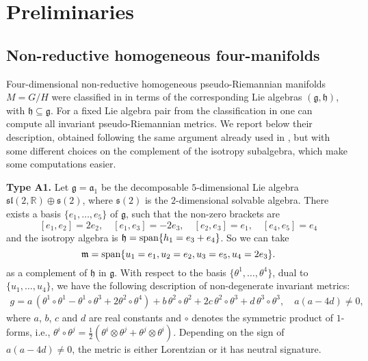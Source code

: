 \documentclass{amsart}
\theoremstyle{plain}
\theoremstyle{remark}
\def\R{\mathbb{R}}
\newcommand\A{{\mathfrak{a}}}
\newcommand\g{{\mathfrak{g}}}
\newcommand\h{{\mathfrak{h}}}
\newcommand\m{{\mathfrak{m}}}
\begin{document}

\section{Preliminaries} \label{sec:preliminaries}

\subsection{Non-reductive homogeneous four-manifolds}
\setcounter{equation}{0}

Four-dimensional non-reductive homogeneous pseudo-Riemannian manifolds $M=G/H$ were classified in \cite{FR} in terms of the corresponding Lie algebras $(\g,\h)$, with $\h \subseteq \g$. For a fixed Lie algebra pair from the classification in \cite{FR} one can compute all invariant pseudo-Riemannian metrics. We report below their description, obtained following the same argument already used in \cite{CF}, but with some different choices on the complement of the isotropy subalgebra, which make some computations easier. 

\medskip\noindent
{\bf Type A1.} Let $\g=\A _1$ be the decomposable $5$-dimensional Lie algebra $\mathfrak{sl}(2,\R) \oplus \mathfrak{s} (2)$, where $\mathfrak{s} (2)$ is the $2$-dimensional solvable algebra. There exists a basis $\{e_1,\ldots,e_5\}$ of $\g$, such that the non-zero brackets are
\[
[e_1,e_2]=2e_2, \quad [e_1,e_3]=-2e_3, \quad [e_2,e_3]=e_1, \quad [e_4,e_5]=e_4
\]
and the isotropy algebra is $\h={\rm span}\{h_1=e_3+e_4\}$. So we can take
\begin{equation}\label{eq:mA1}
\m= {\rm span}\{u_1=e_1,u_2=e_2,u_3=e_5,u_4=2 e_3\}.
\end{equation}
as a complement of $\h$ in $\g$. With respect to the basis $\{\theta^1,\ldots,\theta^4\}$, dual to $\{u_1,\ldots,u_4\}$, we have the following description of non-degenerate invariant metrics:
\begin{equation}\label{gA1}
\begin{array}{l} g=   a \,\left(\theta^1 \circ \theta^1 - \theta^1 \circ \theta^3+2 \theta^2 \circ \theta^4\right) +b\, \theta^2 \circ \theta^2 + 2c \, \theta^2 \circ \theta^3+d \, \theta^3 \circ \theta^3,  \quad a ( a -4d)\neq 0,
\end{array}
\end{equation}
where $a$, $b$, $c$ and $d$ are real constants and $\circ$ denotes the symmetric product of $1$-forms, i.e., $\theta^i \circ \theta^j = \frac{1}{2}(\theta^i\otimes\theta^j + \theta^j\otimes\theta^i)$. Depending on the sign of
 $a ( a -4d)\neq 0$, the metric is either Lorentzian or it has neutral signature.
\end{document}
